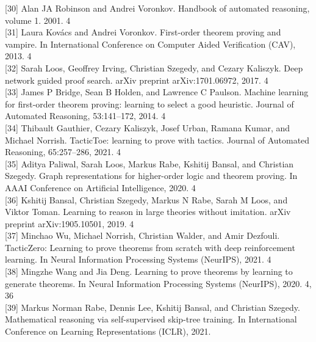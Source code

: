 \documentclass[
]{article}
\begin{document}
{[}30{]} Alan JA Robinson and Andrei Voronkov. Handbook of automated
reasoning, volume 1. 2001. 4\\
{[}31{]} Laura Kovács and Andrei Voronkov. First-order theorem proving
and vampire. In International Conference on Computer Aided Verification
(CAV), 2013. 4\\
{[}32{]} Sarah Loos, Geoffrey Irving, Christian Szegedy, and Cezary
Kaliszyk. Deep network guided proof search. arXiv preprint
arXiv:1701.06972, 2017. 4\\
{[}33{]} James P Bridge, Sean B Holden, and Lawrence C Paulson. Machine
learning for first-order theorem proving: learning to select a good
heuristic. Journal of Automated Reasoning, 53:141--172, 2014. 4\\
{[}34{]} Thibault Gauthier, Cezary Kaliszyk, Josef Urban, Ramana Kumar,
and Michael Norrish. TacticToe: learning to prove with tactics. Journal
of Automated Reasoning, 65:257--286, 2021. 4\\
{[}35{]} Aditya Paliwal, Sarah Loos, Markus Rabe, Kshitij Bansal, and
Christian Szegedy. Graph representations for higher-order logic and
theorem proving. In AAAI Conference on Artificial Intelligence, 2020.
4\\
{[}36{]} Kshitij Bansal, Christian Szegedy, Markus N Rabe, Sarah M Loos,
and Viktor Toman. Learning to reason in large theories without
imitation. arXiv preprint arXiv:1905.10501, 2019. 4\\
{[}37{]} Minchao Wu, Michael Norrish, Christian Walder, and Amir
Dezfouli. TacticZero: Learning to prove theorems from scratch with deep
reinforcement learning. In Neural Information Processing Systems
(NeurIPS), 2021. 4\\
{[}38{]} Mingzhe Wang and Jia Deng. Learning to prove theorems by
learning to generate theorems. In Neural Information Processing Systems
(NeurIPS), 2020. 4, 36\\
{[}39{]} Markus Norman Rabe, Dennis Lee, Kshitij Bansal, and Christian
Szegedy. Mathematical reasoning via self-supervised skip-tree training.
In International Conference on Learning Representations (ICLR), 2021.
\end{document}
